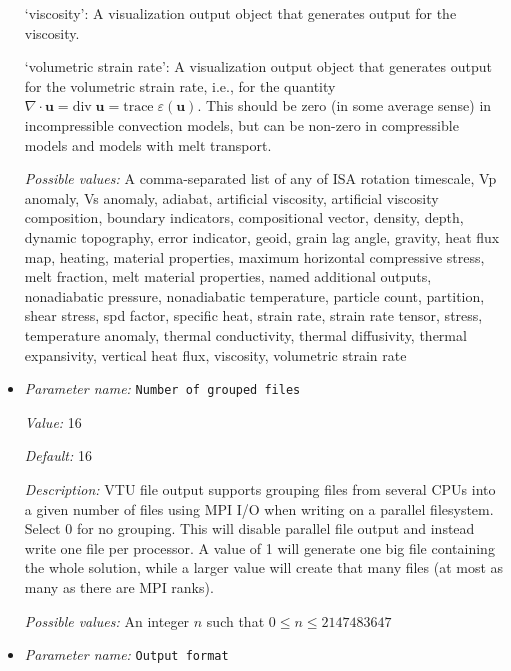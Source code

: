 \begin{itemize}
`viscosity': A visualization output object that generates output for the viscosity.

`volumetric strain rate': A visualization output object that generates output for the volumetric strain rate, i.e., for the quantity $\nabla\cdot\mathbf u = \textrm{div}\; \mathbf u = \textrm{trace}\; \varepsilon(\mathbf u)$. This should be zero (in some average sense) in incompressible convection models, but can be non-zero in compressible models and models with melt transport.


{\it Possible values:} A comma-separated list of any of ISA rotation timescale, Vp anomaly, Vs anomaly, adiabat, artificial viscosity, artificial viscosity composition, boundary indicators, compositional vector, density, depth, dynamic topography, error indicator, geoid, grain lag angle, gravity, heat flux map, heating, material properties, maximum horizontal compressive stress, melt fraction, melt material properties, named additional outputs, nonadiabatic pressure, nonadiabatic temperature, particle count, partition, shear stress, spd factor, specific heat, strain rate, strain rate tensor, stress, temperature anomaly, thermal conductivity, thermal diffusivity, thermal expansivity, vertical heat flux, viscosity, volumetric strain rate
\item {\it Parameter name:} {\tt Number of grouped files}
\label{parameters:Postprocess/Visualization/Number of grouped files}
\label{parameters:Postprocess/Visualization/Number_20of_20grouped_20files}


{\it Value:} 16


{\it Default:} 16


{\it Description:} VTU file output supports grouping files from several CPUs into a given number of files using MPI I/O when writing on a parallel filesystem. Select 0 for no grouping. This will disable parallel file output and instead write one file per processor. A value of 1 will generate one big file containing the whole solution, while a larger value will create that many files (at most as many as there are MPI ranks).


{\it Possible values:} An integer $n$ such that $0\leq n \leq 2147483647$
\item {\it Parameter name:} {\tt Output format}
\label{parameters:Postprocess/Visualization/Output format}
\label{parameters:Postprocess/Visualization/Output_20format}



\end{itemize}
